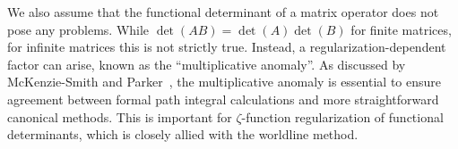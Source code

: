 We also assume that the functional determinant of a matrix operator does not pose any problems.  
While $\det(AB)=\det(A)\det(B)$ for finite matrices, for infinite matrices this is not strictly true. 
Instead, a regularization-dependent factor can arise, known as the ``multiplicative anomaly''.
As discussed by McKenzie-Smith and Parker~\cite{McKenzieSmith1998}, 
the multiplicative anomaly is essential to ensure agreement between 
formal path integral calculations and more straightforward canonical methods.  
This is important for $\zeta$-function regularization of functional determinants, 
which is closely allied with the worldline method.

